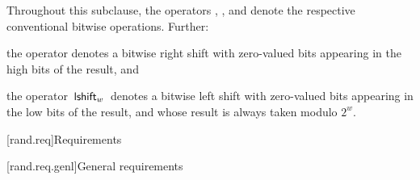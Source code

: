 \pnum
Throughout this subclause,
the operators
\bitand, \bitor, and \xor
denote the respective conventional bitwise operations.
Further:

\begin{enumeratea}
 \item
   the operator \rightshift\xspace
   denotes a bitwise right shift
   with zero-valued bits appearing in the high bits of the result,
 and
 \item
   the operator $ \, \mathsf{lshift}_w \, $
   denotes a bitwise left shift
   with zero-valued bits appearing in the low bits of the result,
   and whose result is always taken modulo $2^w$.
\end{enumeratea}



[rand.req]{Requirements}%


[rand.req.genl]{General requirements}%

